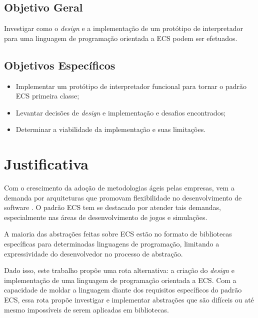 \subsection{Objetivo Geral}\label{sec:obj_geral}

Investigar como o \textit{design} e a implementação de um protótipo de interpretador para uma linguagem de programação orientada a ECS podem ser efetuados.

\subsection{Objetivos Específicos}

\begin{itemize}
    \item Implementar um protótipo de interpretador funcional para tornar o padrão ECS primeira classe;
    \item Levantar decisões de \textit{design} e implementação e desafios encontrados;
    \item Determinar a viabilidade da implementação e suas limitações.
\end{itemize}

\section{Justificativa}

Com o crescimento da adoção de metodologias ágeis pelas empresas, vem a demanda por arquiteturas que promovam flexibilidade no desenvolvimento de software \cite{flightdynamics}. O padrão ECS tem se destacado por atender tais demandas, especialmente nas áreas de desenvolvimento de jogos e simulações.

A maioria das abstrações feitas sobre ECS estão no formato de bibliotecas específicas para determinadas linguagens de programação, limitando a expressividade do desenvolvedor no processo de abstração.

Dado isso, este trabalho propõe uma rota alternativa: a criação do \textit{design} e implementação de uma linguagem de programação orientada a ECS. Com a capacidade de moldar a linguagem diante dos requisitos específicos do padrão ECS, essa rota propõe investigar e implementar abstrações que são difíceis ou até mesmo impossíveis de serem aplicadas em bibliotecas.
